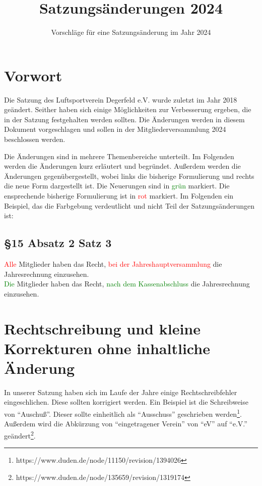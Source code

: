 \documentclass[10pt,a4paper,parskip=half]{scrartcl}
\title{Satzungsänderungen 2024}
\subtitle{Vorschläge für eine Satzungsänderung im Jahr 2024}
\newcommand{\new}[1]{\textcolor{Green}{#1}}
\newcommand{\old}[1]{\textcolor{Red}{#1}}
\newcommand{\compare}[3]{\subsection*{#1}\begin{multicols}{2}#2\columnbreak\\#3\end{multicols}}
\begin{document}
\maketitle
  
  
  
  

  \section{Vorwort}
  Die Satzung des Luftsportverein Degerfeld e.V. wurde zuletzt im Jahr 2018 geändert. Seither haben sich einige Möglichkeiten zur Verbesserung ergeben, die in der Satzung festgehalten werden sollten. Die Änderungen werden in diesem Dokument vorgeschlagen und sollen in der Mitgliederversammlung 2024 beschlossen werden.

  Die Änderungen sind in mehrere Themenbereiche unterteilt. Im Folgenden werden die Änderungen kurz erläutert und begründet. Außerdem werden die Änderungen gegenübergestellt, wobei links die bisherige Formulierung und rechts die neue Form dargestellt ist. Die Neuerungen sind in \new{grün} markiert. Die ensprechende bisherige Formulierung ist in \old{rot} markiert. Im Folgenden ein Beispiel, das die Farbgebung verdeutlicht und nicht Teil der Satzungsänderungen ist:

  \compare{§15 Absatz 2 Satz 3}
  {\old{Alle} Mitglieder haben das Recht, \old{bei der Jahreshauptversammlung} die Jahresrechnung einzusehen.}
  {\new{Die} Mitglieder haben das Recht, \new{nach dem Kassenabschluss} die Jahresrechnung einzusehen.}



  \section{Rechtschreibung und kleine Korrekturen ohne inhaltliche Änderung}
  In unserer Satzung haben sich im Laufe der Jahre einige Rechtschreibfehler eingeschlichen. Diese sollten korrigiert werden.
  Ein Beispiel ist die Schreibweise von "`Auschuß"'. Dieser sollte einheitlich als "`Ausschuss"' geschrieben werden\footnote{https://www.duden.de/node/11150/revision/1394026}.
  Außerdem wird die Abkürzung von "`eingetragener Verein"' von "`eV"' auf "`e.V."' geändert\footnote{https://www.duden.de/node/135659/revision/1319174}.
\end{document}
